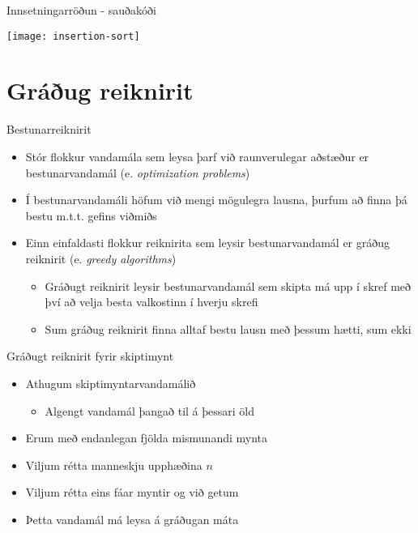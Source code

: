 \documentclass[handout]{beamer}
\begin{document}
\begin{frame}{Innsetningarröðun - sauðakóði}
\begin{center}
\texttt{[image: insertion-sort]}
\end{center}
\end{frame}

\section{Gráðug reiknirit}

\begin{frame}{Bestunarreiknirit}
\begin{itemize}
 \item Stór flokkur vandamála sem leysa þarf við raunverulegar aðstæður er bestunarvandamál (e. \emph{optimization problems})
 \item Í bestunarvandamáli höfum við mengi mögulegra lausna, þurfum að finna þá bestu m.t.t. gefins viðmiðs
 \item Einn einfaldasti flokkur reiknirita sem leysir bestunarvandamál er gráðug reiknirit (e. \emph{greedy algorithms})
 \begin{itemize}
  \item Gráðugt reiknirit leysir bestunarvandamál sem skipta má upp í skref með því að velja besta valkostinn í hverju skrefi
  \item Sum gráðug reiknirit finna alltaf bestu lausn með þessum hætti, sum ekki
 \end{itemize}
\end{itemize}
\end{frame}

\begin{frame}{Gráðugt reiknirit fyrir skiptimynt}
\begin{itemize}
 \item Athugum skiptimyntarvandamálið
 \begin{itemize}
  \item Algengt vandamál þangað til á þessari öld \pause
 \end{itemize}
 \item Erum með endanlegan fjölda mismunandi mynta
 \item Viljum rétta manneskju upphæðina $n$
 \item Viljum rétta eins fáar myntir og við getum
 \item Þetta vandamál má leysa á gráðugan máta
\end{itemize}
\end{frame}
\end{document}
